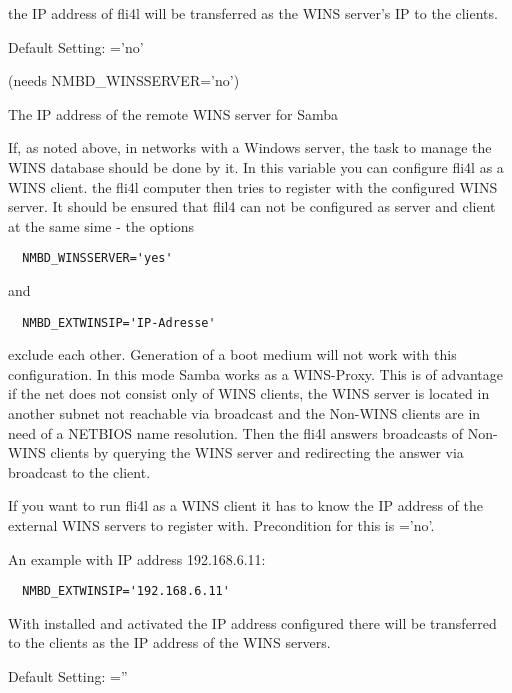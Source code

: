 \begin{description}
  the IP address of fli4l will be transferred as the WINS server's IP
  to the clients.

  Default Setting: ='no'


 (needs NMBD\_WINSSERVER='no')

  The IP address of the remote WINS server for Samba

  If, as noted above, in networks with a Windows server,
  the task to manage the WINS database should be done by it.
  In this variable you can configure fli4l as a WINS client. the
  fli4l computer then tries to register with the configured WINS server.
  It should be ensured that flil4 can not be configured as server and
  client at the same sime - the options

\begin{example}
\begin{verbatim}
  NMBD_WINSSERVER='yes'
\end{verbatim}
\end{example}

  and

\begin{example}
\begin{verbatim}
  NMBD_EXTWINSIP='IP-Adresse'
\end{verbatim}
\end{example}

  exclude each other. Generation of a boot medium will not work with this
  configuration. In this mode Samba works as a WINS-Proxy. This is of
  advantage if the net does not consist only of WINS clients, the WINS
  server is located in another subnet not reachable via broadcast
  and the Non-WINS clients are in need of a NETBIOS name resolution.
  Then the fli4l answers broadcasts of Non-WINS clients by querying the
  WINS server and redirecting the answer via broadcast to the client.

  If you want to run fli4l as a WINS client it has to know the
  IP address of the external WINS servers to register with. Precondition
  for this is ='no'.

  An example with IP address 192.168.6.11:

\begin{example}
\begin{verbatim}
  NMBD_EXTWINSIP='192.168.6.11'
\end{verbatim}
\end{example}

  With  installed and activated the IP address configured
  there will be transferred to the clients as the IP address of the WINS servers.

  Default Setting: =''


\end{description}

